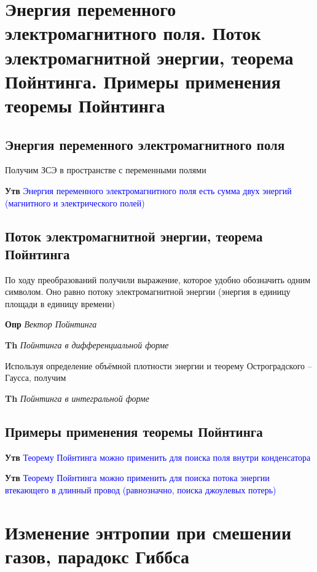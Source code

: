 \documentclass[a4paper, 14pt]{article}
\begin{document}
    \section{Энергия переменного электромагнитного поля.
    Поток электромагнитной энергии, теорема Пойнтинга.
    Примеры применения теоремы Пойнтинга}
    
    \subsection{Энергия переменного электромагнитного поля}
    
    Получим ЗСЭ в пространстве с переменными полями
    
    \textbf{Утв} \textcolor{blue}{Энергия переменного электромагнитного поля есть сумма двух энергий (магнитного и
    электрического полей)}
    
    \subsection{Поток электромагнитной энергии, теорема Пойнтинга}
    
    По ходу преобразований получили выражение, которое удобно обозначить одним символом.
    Оно равно потоку электромагнитной энергии (энергия в единицу площади в единицу времени)
    
    \textbf{Опр} \textit{Вектор Пойнтинга}
    
    \textbf{Th} \textit{Пойнтинга в дифференциальной форме}
    
    Используя определение объёмной плотности энергии и теорему Остроградского -- Гаусса, получим
    
    \textbf{Th} \textit{Пойнтинга в интегральной форме}
    
    \subsection{Примеры применения теоремы Пойнтинга}
    
    \textbf{Утв} \textcolor{blue}{Теорему Пойнтинга можно применить для поиска поля внутри конденсатора}
    
    \textbf{Утв} \textcolor{blue}{Теорему Пойнтинга можно применить для поиска потока энергии втекающего в
    длинный провод (равнозначно, поиска джоулевых потерь)}
    
    \section{Изменение энтропии при смешении газов, парадокс Гиббса}
    
\end{document}
